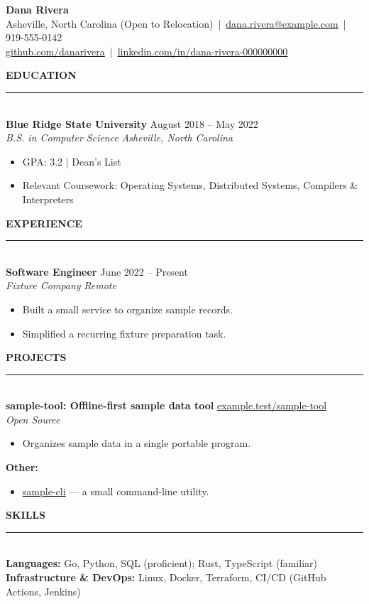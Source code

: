 \documentclass{article}
\newcommand{\sectionheader}[1]{%
  {\large\textbf{\MakeUppercase{#1}}}\\[-0.3em]%
  \rule{\textwidth}{0.5pt}\\[0.15em]%
}
\newcommand{\entry}[4]{%
  \textbf{#1} \hfill #4 \\
  \textit{#2} \hfill \textit{#3} \\[0.06em]
}
\begin{document}
\pagestyle{empty}

\begin{center}
    {\Large\textbf{Dana Rivera}}\\[0.3em]
    \small Asheville, North Carolina (Open to Relocation) \,|\, \href{mailto:dana.rivera@example.com}{dana.rivera@example.com} \,|\, 919-555-0142 \\[0.1em]
    \small \href{https://github.com/danarivera}{github.com/danarivera} \,|\, \href{https://www.linkedin.com/in/dana-rivera-000000000/}{linkedin.com/in/dana-rivera-000000000}
\end{center}

\sectionheader{Education}
\entry{Blue Ridge State University}{B.S. in Computer Science}{Asheville, North Carolina}{August 2018 -- May 2022}
\begin{itemize}[leftmargin=*]
    \item GPA: 3.2 | Dean's List
    \item Relevant Coursework: Operating Systems, Distributed Systems, Compilers \& Interpreters
\end{itemize}

\sectionheader{Experience}
\entry{Software Engineer}{Fixture Company}{Remote}{June 2022 -- Present}
\begin{itemize}[leftmargin=*]
    \item Built a small service to organize sample records.
    \item Simplified a recurring fixture preparation task.
\end{itemize}

\sectionheader{Projects}
\entry{sample-tool: Offline-first sample data tool}{Open Source}{}{\href{https://example.test/sample-tool}{example.test/sample-tool}}
\begin{itemize}[leftmargin=*]
    \item Organizes sample data in a single portable program.
\end{itemize}

\vspace{0.55em}
\noindent\textbf{Other:}
\begin{itemize}[leftmargin=*]
    \item \href{https://example.test/sample-cli}{sample-cli} --- a small command-line utility.
\end{itemize}

\sectionheader{Skills}
\noindent\textbf{Languages:} Go, Python, SQL (proficient); Rust, TypeScript (familiar) \\
\noindent\textbf{Infrastructure \& DevOps:} Linux, Docker, Terraform, CI/CD (GitHub Actions, Jenkins)
\end{document}

